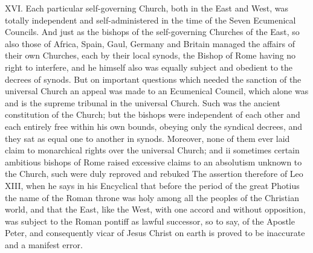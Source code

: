 XVI. Each particular self-governing Church, both in the East and West,
was totally independent and self-administered in the time of the Seven
Ecumenical Councils. And just as the bishops of the self-governing
Churches of the East, so also those of Africa, Spain, Gaul, Germany and
Britain managed the affairs of their own Churches, each by their local
synods, the Bishop of Rome having no right to interfere, and he himself
also was equally subject and obedient to the decrees of synods. But on
important questions which needed the sanction of the universal Church an
appeal was made to an Ecumenical Council, which alone was and is the
supreme tribunal in the universal Church. Such was the ancient
constitution of the Church; but the bishops were independent of each
other and each entirely free within his own bounds, obeying only the
syndical decrees, and they sat as equal one to another in synods.
Moreover, none of them ever laid claim to monarchical rights over the
universal Church; and ii sometimes certain ambitious bishops of Rome
raised excessive claims to an absolutism unknown to the Church, such
were duly reproved and rebuked The assertion therefore of Leo XIII, when
he says in his Encyclical that before the period of the great Photius
the name of the Roman throne was holy among all the peoples of the
Christian world, and that the East, like the West, with one accord and
without opposition, was subject to the Roman pontiff as lawful
successor, so to say, of the Apostle Peter, and consequently vicar of
Jesus Christ on earth is proved to be inaccurate and a manifest error.

